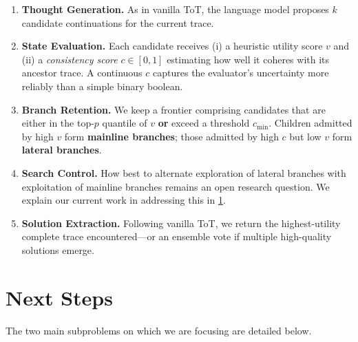 \documentclass[onecolumn]{IEEEtran}
\begin{document}
\begin{enumerate}
    \item
        \textbf{Thought Generation.}
        As in vanilla ToT, the language model proposes $k$ candidate continuations for the current trace.
    \item
        \textbf{State Evaluation.}
        Each candidate receives (i) a heuristic utility score $v$ and (ii) a \textit{consistency score} $c \in [0, 1]$ estimating how well it coheres with its ancestor trace.
        A continuous $c$ captures the evaluator's uncertainty more reliably than a simple binary boolean.
    \item
        \textbf{Branch Retention.}
        We keep a frontier comprising candidates that are either in the top-$p$ quantile of $v$ \textbf{or} exceed a threshold $c_{\text{min}}$.
        Children admitted by high $v$ form \textbf{mainline branches}; those admitted by high $c$ but low $v$ form \textbf{lateral branches}.
    \item
        \textbf{Search Control.}
        How best to alternate exploration of lateral branches with exploitation of mainline branches remains an open research question.
        We explain our current work in addressing this in \ref{section:next-steps}.
    \item
        \textbf{Solution Extraction.}
        Following vanilla ToT, we return the highest-utility complete trace encountered---or an ensemble vote if multiple high-quality solutions emerge.
\end{enumerate}


\section{Next Steps}
\label{section:next-steps}
The two main subproblems on which we are focusing are detailed below.
\end{document}
